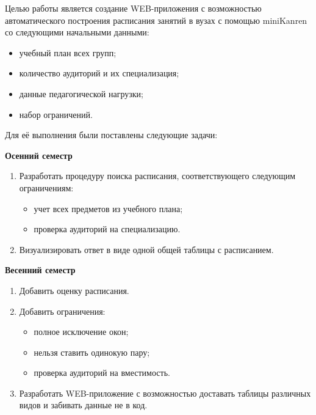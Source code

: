 
\label{sec:task}
 Целью работы является создание WEB-приложения с возможностью автоматического построения расписания занятий в вузах с помощью miniKanren со следующими начальными данными:
  \begin{itemize}
 \item  учебный план всех групп;
 \item  количество аудиторий и их специализация;
 \item  данные педагогической нагрузки;
 \item  набор ограничений.
 \end{itemize}
 
 Для её выполнения были поставлены следующие задачи:

 \textbf{Осенний семестр}
 \begin{enumerate}
 \item Разработать процедуру поиска расписания, соответствующего следующим ограничениям:
 \begin{itemize}
         \item учет всех предметов из учебного плана;
    \item проверка аудиторий на специализацию.
 \end{itemize}
 \item Визуализировать ответ в виде одной общей таблицы с расписанием.
 \end{enumerate}

 \textbf{Весенний семестр}
 \begin{enumerate}
    \item Добавить оценку расписания.
     \item Добавить ограничения:
     \begin{itemize}
         \item полное исключение окон;
    \item нельзя ставить одинокую пару;
    \item проверка аудиторий на вместимость.
 \end{itemize}
    \item Разработать WEB-приложение с возможностью доставать таблицы различных видов и забивать данные не в код.
 \end{enumerate}
